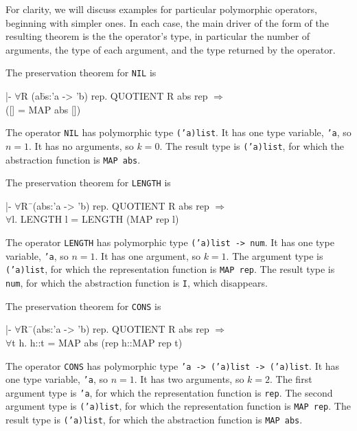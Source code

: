 \documentclass[envcountsame,runningheads]{llncs}
\begin{document}
For clarity, we will discuss examples for particular polymorphic operators,
beginning with simpler ones.
In each case, the main driver of the form of the resulting theorem is the 
the operator's type, in particular the number of arguments, the type of 
each argument, and the type returned by the operator.

The preservation theorem for {\tt NIL} is
{\tt \begin{tabbing}
\hspace{5.5mm}
    |- $\forall$R (a\=bs:'a -> 'b) rep. QUOTIENT R abs rep $\Rightarrow$ \\
\>          ([] = MAP abs [])
\end{tabbing}}
The operator {\tt NIL} has polymorphic type {\tt ('a)list}. 
It has one type variable, {\tt 'a}, so $n = 1$. 
It has no arguments, so $k = 0$.
The result type is
{\tt ('a)list},
for which
the abstraction function
is {\tt MAP abs}.

\pagebreak[2]
The preservation theorem for {\tt LENGTH} is
{\tt \begin{tabbing}
\hspace{5.5mm}
    |- $\forall$R\=\ (abs:'a -> 'b) rep. QUOTIENT R abs rep $\Rightarrow$ \\
\>       $\forall$l. LENGTH l = LENGTH (MAP rep l)
\end{tabbing}}
The operator {\tt LENGTH} has polymorphic type {\tt ('a)list -> num}. 
It has one type variable, {\tt 'a}, so $n = 1$. 
It has one argument, so $k = 1$.
The argument type is
{\tt ('a)list},
for which
the representation function
is {\tt MAP rep}.
The result type is
{\tt num},
for which
the abstraction function
is {\tt I}, which disappears.

The preservation theorem for {\tt CONS} is
{\tt \begin{tabbing}
\hspace{5.5mm}
    |- $\forall$R\=\ (abs:'a -> 'b) rep. QUOTIENT R abs rep $\Rightarrow$ \\
\>       $\forall$t h. h::t = MAP abs (rep h::MAP rep t)
\end{tabbing}}
The operator {\tt CONS} has polymorphic type {\tt 'a -> ('a)list -> ('a)list}. 
It has one type variable, {\tt 'a}, so $n = 1$. 
It has two arguments, so $k = 2$.
The first argument type is
{\tt 'a},
for which
the representation function
is {\tt rep}.
The second argument type is
{\tt ('a)list},
for which
the representation function
is {\tt MAP rep}.
The result type is
{\tt ('a)list},
for which
the abstraction function
is {\tt MAP abs}.
\end{document}
